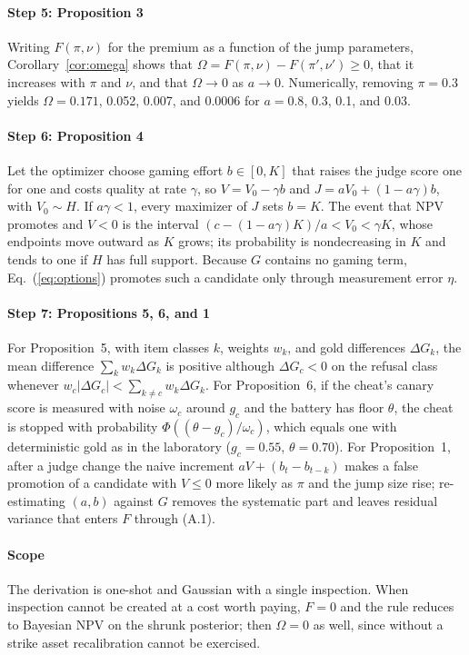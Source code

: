 \documentclass[acmsmall,screen,review,anonymous]{acmart}
\theoremstyle{acmdefinition}
\begin{document}
\paragraph{Step 5: Proposition 3} Writing $F(\pi,\nu)$ for the premium as a function of the jump parameters, Corollary~\ref{cor:omega} shows that $\Omega = F(\pi,\nu) - F(\pi',\nu') \ge 0$, that it increases with $\pi$ and $\nu$, and that $\Omega \to 0$ as $a \to 0$. Numerically, removing $\pi = 0.3$ yields $\Omega = 0.171$, 0.052, 0.007, and 0.0006 for $a = 0.8$, 0.3, 0.1, and 0.03.

\paragraph{Step 6: Proposition 4} Let the optimizer choose gaming effort $b \in [0,K]$ that raises the judge score one for one and costs quality at rate $\gamma$, so $V = V_0 - \gamma b$ and $J = aV_0 + (1 - a\gamma)b$, with $V_0 \sim H$. If $a\gamma < 1$, every maximizer of $J$ sets $b = K$. The event that NPV promotes and $V < 0$ is the interval $(c - (1-a\gamma)K)/a < V_0 < \gamma K$, whose endpoints move outward as $K$ grows; its probability is nondecreasing in $K$ and tends to one if $H$ has full support. Because $G$ contains no gaming term, Eq.~(\ref{eq:options}) promotes such a candidate only through measurement error $\eta$.

\paragraph{Step 7: Propositions 5, 6, and 1} For Proposition~5, with item classes $k$, weights $w_k$, and gold differences $\Delta G_k$, the mean difference $\sum_k w_k\Delta G_k$ is positive although $\Delta G_c < 0$ on the refusal class whenever $w_c|\Delta G_c| < \sum_{k\ne c} w_k\Delta G_k$. For Proposition~6, if the cheat's canary score is measured with noise $\omega_c$ around $g_c$ and the battery has floor $\theta$, the cheat is stopped with probability $\Phi((\theta - g_c)/\omega_c)$, which equals one with deterministic gold as in the laboratory ($g_c = 0.55$, $\theta = 0.70$). For Proposition~1, after a judge change the naive increment $aV + (b_t - b_{t-k})$ makes a false promotion of a candidate with $V \le 0$ more likely as $\pi$ and the jump size rise; re-estimating $(a,b)$ against $G$ removes the systematic part and leaves residual variance that enters $F$ through (A.1).

\paragraph{Scope} The derivation is one-shot and Gaussian with a single inspection. When inspection cannot be created at a cost worth paying, $F = 0$ and the rule reduces to Bayesian NPV on the shrunk posterior; then $\Omega = 0$ as well, since without a strike asset recalibration cannot be exercised.
\end{document}
